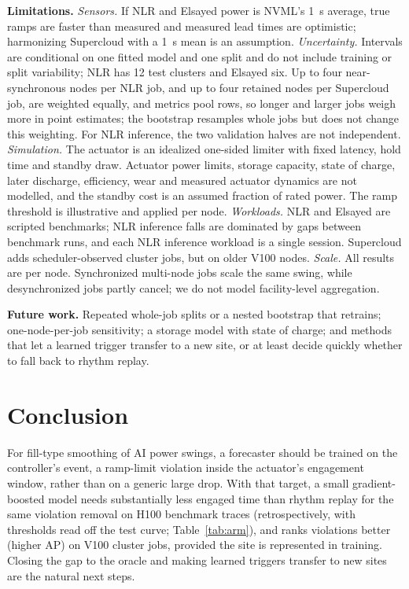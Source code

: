\documentclass[11pt]{article}
\begin{document}
\textbf{Limitations.}
\emph{Sensors.} If NLR and Elsayed power is NVML's 1~s average, true ramps are faster than measured and
measured lead times are optimistic; harmonizing Supercloud with a 1~s mean is an assumption.
\emph{Uncertainty.} Intervals are conditional on one fitted model and one split and do not include
training or split variability; NLR has 12 test clusters and Elsayed six. Up to four near-synchronous nodes
per NLR job, and up to four retained nodes per Supercloud job, are weighted equally, and metrics pool rows, so longer and larger
jobs weigh more in point estimates; the bootstrap resamples whole jobs but does not change this
weighting. For NLR inference, the two
validation halves are not independent.
\emph{Simulation.} The actuator is an idealized one-sided limiter with fixed latency, hold time and
standby draw. Actuator power limits, storage capacity, state of charge, later discharge, efficiency,
wear and measured actuator dynamics are not modelled, and the standby cost is an assumed fraction of rated
power. The ramp threshold is illustrative and applied per node.
\emph{Workloads.} NLR and Elsayed are scripted benchmarks; NLR inference falls are dominated by gaps
between benchmark runs, and each NLR inference workload is a single session. Supercloud adds scheduler-observed cluster
jobs, but on older V100 nodes.
\emph{Scale.} All results are per node. Synchronized multi-node jobs scale the same swing, while
desynchronized jobs partly cancel; we do not model facility-level aggregation.

\textbf{Future work.} Repeated whole-job splits or a nested bootstrap that retrains; one-node-per-job
sensitivity; a storage model with state of charge; and methods that let a learned trigger transfer to a
new site, or at least decide quickly whether to fall back to rhythm replay.

\section{Conclusion}

For fill-type smoothing of AI power swings, a forecaster should be trained on the controller's event, a
ramp-limit violation inside the actuator's engagement window, rather than on a generic large drop. With
that target, a small gradient-boosted model needs substantially less engaged time than rhythm replay for
the same violation removal on H100 benchmark traces (retrospectively, with thresholds read off the test
curve; Table~\ref{tab:arm}), and ranks violations better (higher AP) on V100
cluster jobs, provided the site is represented in training. Closing the gap to the oracle and making learned
triggers transfer to new sites are the natural next steps.
\end{document}
